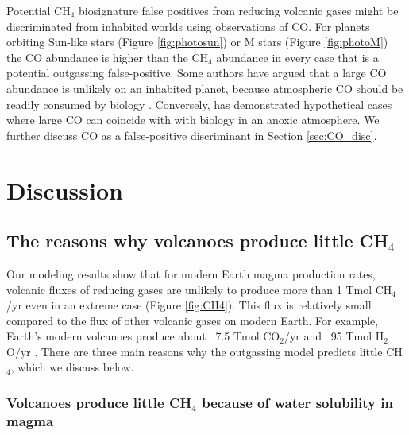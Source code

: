 Potential CH$_4$ biosignature false positives from reducing volcanic gases might be discriminated from inhabited worlds using observations of CO. For planets orbiting Sun-like stars (Figure \ref{fig:photosun}) or M stars (Figure \ref{fig:photoM}) the CO abundance is higher than the CH$_4$ abundance in every case that is a potential outgassing false-positive. Some authors have argued that a large CO abundance is unlikely on an inhabited planet, because atmospheric CO should be readily consumed by biology \citep{Krissansen-Totton_2018a}. Conversely, \citet{Schwieterman_2019} has demonstrated hypothetical cases where large CO can coincide with with biology in an anoxic atmosphere. We further discuss CO as a false-positive discriminant in Section \ref{sec:CO_disc}.

\section{Discussion}

\subsection{The reasons why volcanoes produce little CH$_4$} \label{sec:littleCH4}

Our modeling results show that for modern Earth magma production rates, volcanic fluxes of reducing gases are unlikely to produce more than 1 Tmol CH$_4$/yr even in an extreme case (Figure \ref{fig:CH4}). This flux is relatively small compared to the flux of other volcanic gases on modern Earth. For example, Earth's modern volcanoes produce about ~7.5 Tmol CO$_2$/yr and ~95 Tmol H$_2$O/yr \citep[p. 203]{Catling_2017}. There are three main reasons why the outgassing model predicts little CH$_4$, which we discuss below.

\subsubsection{Volcanoes produce little CH$_4$ because of water solubility in magma} \label{sec:water_solu}

